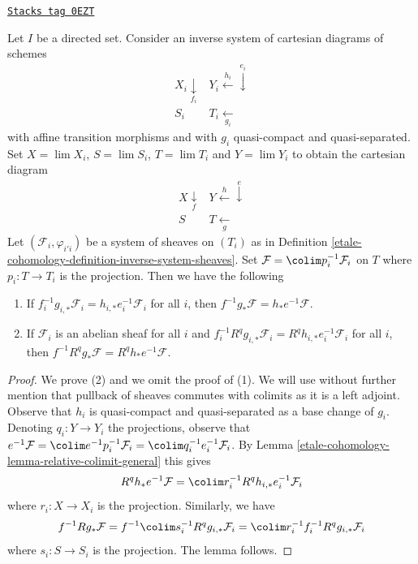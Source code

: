 \begin{lemma}
\label{etale-cohomology-lemma-base-change-Rf-star-colim}
\href{https://stacks.math.columbia.edu/tag/0EZT}{\texttt{Stacks tag 0EZT}}

Let $I$ be a directed set. Consider an inverse system of
cartesian diagrams of schemes
$$
\begin{array}{cc}X_i \underset{f_i}{\downarrow} & Y_i \overset{h_i}{\longleftarrow}\overset{e_i}{\downarrow} \\ S_i & T_i \underset{g_i}{\longleftarrow}\end{array}
$$
with affine transition morphisms and with $g_i$ quasi-compact and
quasi-separated. Set $X = \lim X_i$,
$S = \lim S_i$, $T = \lim T_i$ and $Y = \lim Y_i$ to
obtain the cartesian diagram
$$
\begin{array}{cc}X \underset{f}{\downarrow} & Y \overset{h}{\longleftarrow}\overset{e}{\downarrow} \\ S & T \underset{g}{\longleftarrow}\end{array}
$$
Let $(\mathcal{F}_i, \varphi_{i'i})$ be a system of sheaves on
$(T_i)$ as in Definition \ref{etale-cohomology-definition-inverse-system-sheaves}. Set
$\mathcal{F} = \colim p_i^{-1}\mathcal{F}_i$ on $T$
where $p_i : T \to T_i$ is the projection.
Then we have the following
\begin{enumerate}
\item If $f_i^{-1}g_{i, *}\mathcal{F}_i = h_{i, *}e_i^{-1}\mathcal{F}_i$
for all $i$, then
$f^{-1}g_*\mathcal{F} = h_*e^{-1}\mathcal{F}$.
\item If $\mathcal{F}_i$ is an abelian sheaf for all $i$ and
$f_i^{-1}R^qg_{i, *}\mathcal{F}_i = R^qh_{i, *}e_i^{-1}\mathcal{F}_i$
for all $i$, then
$f^{-1}R^qg_*\mathcal{F} = R^qh_*e^{-1}\mathcal{F}$.
\end{enumerate}
\end{lemma}

\begin{proof}
We prove (2) and we omit the proof of (1). We will use without further
mention that pullback of sheaves commutes with colimits as it is a
left adjoint. Observe that $h_i$ is quasi-compact and quasi-separated as a
base change of $g_i$.
Denoting $q_i : Y \to Y_i$ the projections, observe that
$e^{-1}\mathcal{F} = \colim e^{-1}p_i^{-1}\mathcal{F}_i =
\colim q_i^{-1}e_i^{-1}\mathcal{F}_i$.
By Lemma \ref{etale-cohomology-lemma-relative-colimit-general}
this gives
$$
R^qh_*e^{-1}\mathcal{F} = \colim r_i^{-1}R^qh_{i, *}e_i^{-1}\mathcal{F}_i
$$
where $r_i : X \to X_i$ is the projection.
Similarly, we have
$$
f^{-1}Rg_*\mathcal{F} =
f^{-1}\colim s_i^{-1}R^qg_{i, *}\mathcal{F}_i =
\colim r_i^{-1}f_i^{-1}R^qg_{i, *}\mathcal{F}_i
$$
where $s_i : S \to S_i$ is the projection. The lemma follows.
\end{proof}

